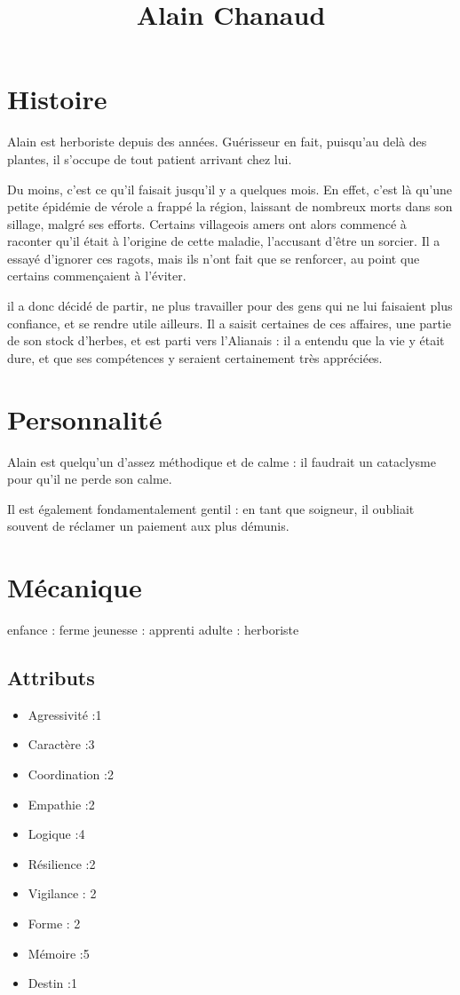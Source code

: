 \documentclass[10pt,a4paper]{article}
\title{Alain Chanaud}
\date{}
\begin{document}
\maketitle
\section{Histoire}
Alain est herboriste depuis des années. Guérisseur en fait, puisqu'au delà des plantes, il s'occupe de tout patient arrivant chez lui.

Du moins, c'est ce qu'il faisait jusqu'il y a quelques mois. En effet, c'est là qu'une petite épidémie de vérole a frappé la région, laissant de nombreux morts dans son sillage, malgré ses efforts. Certains villageois amers ont alors commencé à raconter qu'il était à l'origine de cette maladie, l'accusant d'être un sorcier. Il a essayé d'ignorer ces ragots, mais ils n'ont fait que se renforcer, au point que certains commençaient à l'éviter.

il a donc décidé de partir, ne plus travailler pour des gens qui ne lui faisaient plus confiance, et se rendre utile ailleurs. Il a saisit certaines de ces affaires, une partie de son stock d'herbes, et est parti vers l'Alianais : il a entendu que la vie y était dure, et que ses compétences y seraient certainement très appréciées.
\section{Personnalité}
Alain est quelqu'un d'assez méthodique et de calme : il faudrait un cataclysme pour qu'il ne perde son calme.

Il est également fondamentalement gentil : en tant que soigneur, il oubliait souvent de réclamer un paiement aux plus démunis.
\section{Mécanique}
enfance : ferme
jeunesse : apprenti
adulte : herboriste
\subsection{Attributs}
\begin{itemize}
\item Agressivité :1
\item Caractère :3
\item Coordination :2
\item Empathie :2
\item Logique :4
\item Résilience :2
\item Vigilance : 2
\item Forme : 2
\item Mémoire :5
\item Destin :1
\end{itemize}
\end{document}
